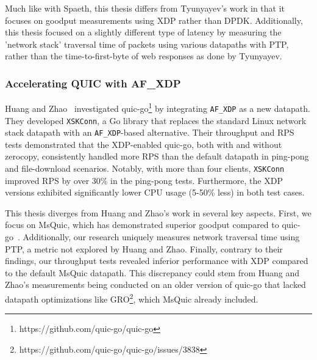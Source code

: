 Much like with Spaeth, this thesis differs from Tyunyayev's work in that it focuses on goodput measurements using \ac{XDP} rather than \ac{DPDK}. Additionally, this thesis focused on a slightly different type of latency by measuring the 'network stack' traversal time of packets using various datapaths with \ac{PTP}, rather than the time-to-first-byte of web responses as done by Tyunyayev.

\subsubsection{Accelerating QUIC with AF\_XDP}
\label{subsubsec:huang-and-zhao}
Huang and Zhao~\cite{10.1007/978-981-97-0798-0_6} investigated quic-go\footnote{https://github.com/quic-go/quic-go} by integrating \texttt{AF\_XDP} as a new datapath. They developed \texttt{XSKConn}, a Go library that replaces the standard Linux network stack datapath with an \texttt{AF\_XDP}-based alternative. Their throughput and \ac{RPS} tests demonstrated that the XDP-enabled quic-go, both with and without zerocopy, consistently handled more \ac{RPS} than the default datapath in ping-pong and file-download scenarios. Notably, with more than four clients, \texttt{XSKConn} improved RPS by over 30\% in the ping-pong tests. Furthermore, the XDP versions exhibited significantly lower CPU usage (5-50\% less) in both test cases.

This thesis diverges from Huang and Zhao's work in several key aspects. First, we focus on MsQuic, which has demonstrated superior goodput compared to quic-go~\cite{spaeth2023}. Additionally, our research uniquely measures network traversal time using \ac{PTP}, a metric not explored by Huang and Zhao. Finally, contrary to their findings, our throughput tests revealed inferior performance with \ac{XDP} compared to the default MsQuic datapath. This discrepancy could stem from Huang and Zhao's measurements being conducted on an older version of quic-go that lacked datapath optimizations like \ac{GRO}\footnote{https://github.com/quic-go/quic-go/issues/3838}, which MsQuic already included.

